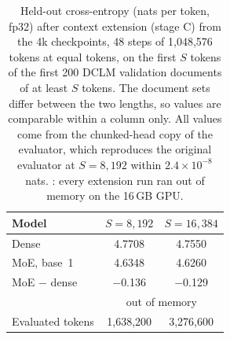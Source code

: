 \begin{table}[t]
\centering
\caption{Held-out cross-entropy (nats per token, fp32) after context extension (stage C) from the 4k checkpoints, 48 steps of 1,048,576 tokens at equal tokens, on the first $S$ tokens of the first 200 DCLM validation documents of at least $S$ tokens. The document sets differ between the two lengths, so values are comparable within a column only. All values come from the chunked-head copy of the evaluator, which reproduces the original evaluator at $S=8{,}192$ within $2.4\times10^{-8}$ nats. \nestor{}: every extension run ran out of memory on the 16\,GB GPU.}
\label{tab:stageC}
\small
\begin{tabular}{@{}lcc@{}}
\toprule
Model & $S=8{,}192$ & $S=16{,}384$\\
\midrule
Dense & 4.7708 & 4.7550\\
MoE, base~1 & 4.6348 & 4.6260\\
MoE $-$ dense & $-$0.136 & $-$0.129\\
\nestor{} & \multicolumn{2}{c}{out of memory}\\
\midrule
Evaluated tokens & 1,638,200 & 3,276,600\\
\bottomrule
\end{tabular}
\end{table}
